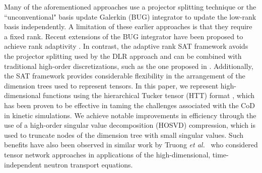 \documentclass[onefignum,onetabnum]{siamart220329}
\newcommand{\etal}{\textit{et al.}~}
\begin{document}
Many of the aforementioned approaches use a projector splitting technique \cite{lubich2014projector,einkemmer2018VPsplitting} or the ``unconventional" basis update Galerkin (BUG) integrator \cite{ceruti2022unconventional} to update the low-rank basis independently. A limitation of these earlier approaches is that they require a fixed rank. Recent extensions of the BUG integrator have been proposed to achieve rank adaptivity \cite{ceruti2022rank-adaptive,HauckPCdynamic23}. In contrast, the adaptive rank SAT framework \cite{GuoVlasovFlowMap2022} avoids the projector splitting used by the DLR approach and can be combined with traditional high-order discretizations, such as the one proposed in \cite{JangAP-IMEX-DG-2015}. Additionally, the SAT framework provides considerable flexibility in the arrangement of the dimension trees used to represent tensors. In this paper, we represent high-dimensional functions using the hierarchical Tucker tensor (HTT) format \cite{HackbuschKuhnHT2009,GrasedyckHTT2010}, which has been proven to be effective in taming the challenges associated with the CoD in kinetic simulations. We achieve notable improvements in efficiency through the use of a high-order singular value decomposition (HOSVD) compression, which is used to truncate nodes of the dimension tree with small singular values. Such benefits have also been observed in similar work by Truong \etal \cite{truong2024tensor} who considered tensor network approaches in applications of the high-dimensional, time-independent neutron transport equations.
\end{document}

